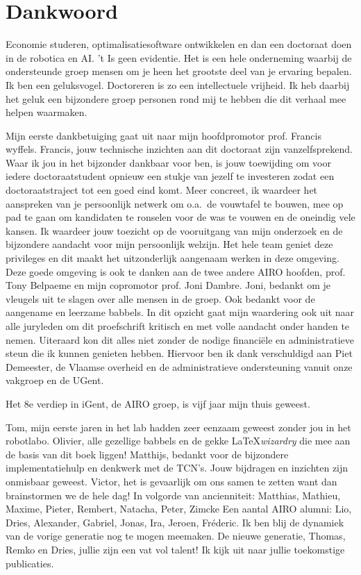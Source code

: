 \documentclass[\home/main.tex]{subfiles}
\begin{document}
	
\chapter{Dankwoord}

Economie studeren, optimalisatiesoftware ontwikkelen en dan een doctoraat doen in de robotica en AI. 't Is geen evidentie. Het is een hele onderneming waarbij de ondersteunde groep mensen om je heen het grootste deel van je ervaring bepalen. 
Ik ben een geluksvogel. Doctoreren is zo een intellectuele vrijheid. Ik heb daarbij het geluk een bijzondere groep personen rond mij te hebben die dit verhaal mee helpen waarmaken. 

Mijn eerste dankbetuiging gaat uit naar mijn hoofdpromotor prof. Francis wyffels. Francis, jouw technische inzichten aan dit doctoraat zijn vanzelfsprekend. Waar ik jou in het bijzonder dankbaar voor ben, is jouw toewijding om voor iedere doctoraatstudent opnieuw een stukje van jezelf te investeren zodat een doctoraatstraject tot een goed eind komt. Meer concreet, ik waardeer het aanspreken van je persoonlijk netwerk om o.a.\ de vouwtafel te bouwen, mee op pad te gaan om kandidaten te ronselen voor de was te vouwen en de oneindig vele kansen. Ik waardeer jouw toezicht op de vooruitgang van mijn onderzoek en de bijzondere aandacht voor mijn persoonlijk welzijn. Het hele team geniet deze privileges en dit maakt het uitzonderlijk aangenaam werken in deze omgeving. Deze goede omgeving is ook te danken aan de twee andere AIRO hoofden, prof. Tony Belpaeme en mijn copromotor prof. Joni Dambre. Joni, bedankt om je vleugels uit te slagen over alle mensen in de groep. Ook bedankt voor de aangename en leerzame babbels. In dit opzicht gaat mijn waardering ook uit naar alle juryleden om dit proefschrift kritisch en met volle aandacht onder handen te nemen.
Uiteraard kon dit alles niet zonder de nodige financiële en administratieve steun die ik kunnen genieten hebben. Hiervoor ben ik dank verschuldigd aan Piet Demeester, de Vlaamse overheid en de administratieve ondersteuning vanuit onze vakgroep en de UGent.

Het 8e verdiep in iGent, de AIRO groep, is vijf jaar mijn thuis geweest. 

Tom, mijn eerste jaren in het lab hadden zeer eenzaam geweest zonder jou in het robotlabo. Olivier, alle gezellige babbels en de gekke \LaTeX \textit{wizardry} die mee aan de basis van dit boek liggen!  
Matthijs, bedankt voor de bijzondere implementatiehulp en denkwerk met de TCN's. Jouw bijdragen en inzichten zijn onmisbaar geweest. Victor, het is gevaarlijk om ons samen te zetten want dan brainstormen we de hele dag! 
In volgorde van ancienniteit: Matthias, Mathieu, Maxime, Pieter, Rembert, Natacha, Peter, Zimcke 
Een aantal AIRO alumni: Lio, Dries, Alexander, Gabriel, Jonas, Ira, Jeroen, Fréderic. Ik ben blij de dynamiek van de vorige generatie nog te mogen meemaken. 
De nieuwe generatie, Thomas, Remko en Dries, jullie zijn een vat vol talent! Ik kijk uit naar jullie toekomstige publicaties. 
\end{document}
